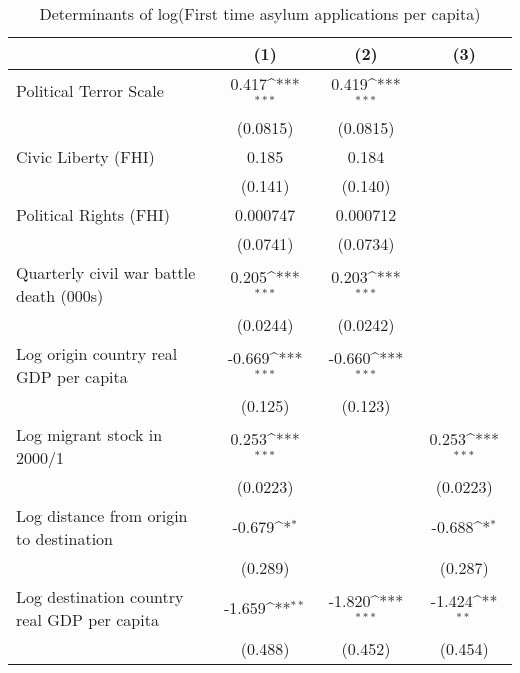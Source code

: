 \begin{table}[htbp]\centering
\def\sym#1{\ifmmode^{#1}\else\(^{#1}\)\fi}
\caption{Determinants of log(First time asylum applications per capita)}
\begin{tabular}{l*{3}{c}}
\hline\hline
                    &\multicolumn{1}{c}{(1)}         &\multicolumn{1}{c}{(2)}         &\multicolumn{1}{c}{(3)}         \\
\hline
Political Terror Scale&       0.417\sym{***}&       0.419\sym{***}&                     \\
                    &    (0.0815)         &    (0.0815)         &                     \\
[1em]
Civic Liberty (FHI) &       0.185         &       0.184         &                     \\
                    &     (0.141)         &     (0.140)         &                     \\
[1em]
Political Rights (FHI)&    0.000747         &    0.000712         &                     \\
                    &    (0.0741)         &    (0.0734)         &                     \\
[1em]
Quarterly civil war battle death (000s)&       0.205\sym{***}&       0.203\sym{***}&                     \\
                    &    (0.0244)         &    (0.0242)         &                     \\
[1em]
Log origin country real GDP per capita&      -0.669\sym{***}&      -0.660\sym{***}&                     \\
                    &     (0.125)         &     (0.123)         &                     \\
[1em]
Log migrant stock in 2000/1&       0.253\sym{***}&                     &       0.253\sym{***}\\
                    &    (0.0223)         &                     &    (0.0223)         \\
[1em]
Log distance from origin to destination&      -0.679\sym{*}  &                     &      -0.688\sym{*}  \\
                    &     (0.289)         &                     &     (0.287)         \\
[1em]
Log destination country real GDP per capita&      -1.659\sym{**} &      -1.820\sym{***}&      -1.424\sym{**} \\
                    &     (0.488)         &     (0.452)         &     (0.454)         \\

\end{tabular}
\end{table}
